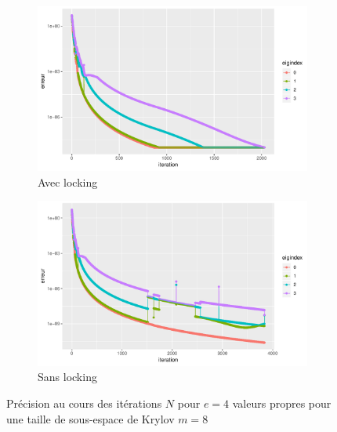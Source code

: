 \documentclass[11pt,a4paper]{article}
\begin{document}
\begin{figure}
	\centering
	\begin{subfigure}{0.49\linewidth}
		\centering
		\includegraphics[width=\linewidth, keepaspectratio]{plots/wlock_e4_p8_m8.pdf}
		\caption{Avec locking\label{wlock_e4_p8_m8}}
	\end{subfigure}
	\begin{subfigure}{0.49\linewidth}
		\centering
		\includegraphics[width=\linewidth, keepaspectratio]{plots/wolock_e4_p8_m8.pdf}
		\caption{Sans locking\label{wolock_e4_p8_m8}}
	\end{subfigure}
	\caption{Précision au cours des itérations $N$ pour $e = 4$ valeurs propres pour une taille de sous-espace de Krylov $m=8$\label{fig:Nvsp-m_e4}}
\end{figure}


% 
% 

%
\end{document}
